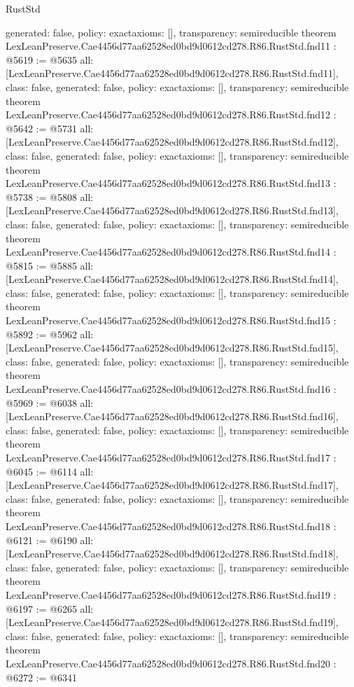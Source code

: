 \begin{lexlean}{RustStd}
\begin{coremodule}
{  generated: false,
  policy: exact{axioms: []},
  transparency: semireducible
}
theorem LexLeanPreserve.Cae4456d77aa62528ed0bd9d0612cd278.R86.RustStd.fnd11 : @5619 := @5635 {
  all: [LexLeanPreserve.Cae4456d77aa62528ed0bd9d0612cd278.R86.RustStd.fnd11],
  class: false,
  generated: false,
  policy: exact{axioms: []},
  transparency: semireducible
}
theorem LexLeanPreserve.Cae4456d77aa62528ed0bd9d0612cd278.R86.RustStd.fnd12 : @5642 := @5731 {
  all: [LexLeanPreserve.Cae4456d77aa62528ed0bd9d0612cd278.R86.RustStd.fnd12],
  class: false,
  generated: false,
  policy: exact{axioms: []},
  transparency: semireducible
}
theorem LexLeanPreserve.Cae4456d77aa62528ed0bd9d0612cd278.R86.RustStd.fnd13 : @5738 := @5808 {
  all: [LexLeanPreserve.Cae4456d77aa62528ed0bd9d0612cd278.R86.RustStd.fnd13],
  class: false,
  generated: false,
  policy: exact{axioms: []},
  transparency: semireducible
}
theorem LexLeanPreserve.Cae4456d77aa62528ed0bd9d0612cd278.R86.RustStd.fnd14 : @5815 := @5885 {
  all: [LexLeanPreserve.Cae4456d77aa62528ed0bd9d0612cd278.R86.RustStd.fnd14],
  class: false,
  generated: false,
  policy: exact{axioms: []},
  transparency: semireducible
}
theorem LexLeanPreserve.Cae4456d77aa62528ed0bd9d0612cd278.R86.RustStd.fnd15 : @5892 := @5962 {
  all: [LexLeanPreserve.Cae4456d77aa62528ed0bd9d0612cd278.R86.RustStd.fnd15],
  class: false,
  generated: false,
  policy: exact{axioms: []},
  transparency: semireducible
}
theorem LexLeanPreserve.Cae4456d77aa62528ed0bd9d0612cd278.R86.RustStd.fnd16 : @5969 := @6038 {
  all: [LexLeanPreserve.Cae4456d77aa62528ed0bd9d0612cd278.R86.RustStd.fnd16],
  class: false,
  generated: false,
  policy: exact{axioms: []},
  transparency: semireducible
}
theorem LexLeanPreserve.Cae4456d77aa62528ed0bd9d0612cd278.R86.RustStd.fnd17 : @6045 := @6114 {
  all: [LexLeanPreserve.Cae4456d77aa62528ed0bd9d0612cd278.R86.RustStd.fnd17],
  class: false,
  generated: false,
  policy: exact{axioms: []},
  transparency: semireducible
}
theorem LexLeanPreserve.Cae4456d77aa62528ed0bd9d0612cd278.R86.RustStd.fnd18 : @6121 := @6190 {
  all: [LexLeanPreserve.Cae4456d77aa62528ed0bd9d0612cd278.R86.RustStd.fnd18],
  class: false,
  generated: false,
  policy: exact{axioms: []},
  transparency: semireducible
}
theorem LexLeanPreserve.Cae4456d77aa62528ed0bd9d0612cd278.R86.RustStd.fnd19 : @6197 := @6265 {
  all: [LexLeanPreserve.Cae4456d77aa62528ed0bd9d0612cd278.R86.RustStd.fnd19],
  class: false,
  generated: false,
  policy: exact{axioms: []},
  transparency: semireducible
}
theorem LexLeanPreserve.Cae4456d77aa62528ed0bd9d0612cd278.R86.RustStd.fnd20 : @6272 := @6341 {
}
\end{coremodule}
\end{lexlean}
